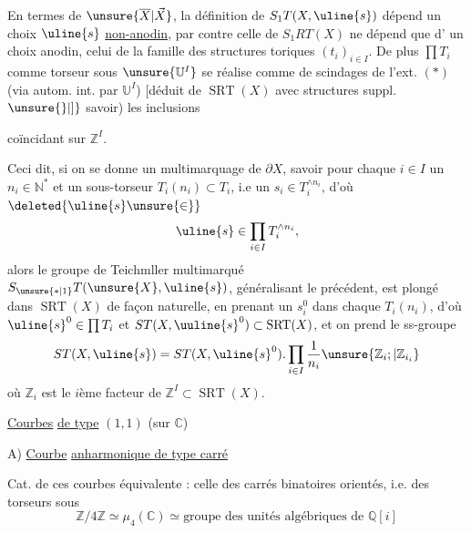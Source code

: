 En termes de $\unsure{\overline X|\vec X}$, la définition de
$S_1T(X,\uline{s})$
dépend un choix $\uline{s}$ \uline{non-anodin},
par contre celle de $S_1RT(X)$ ne dépend que d'
un choix anodin, celui de la famille des
structures toriques $(t_i)_{i\in I}$.
De plus $\prod T_i$ comme
torseur sous $\unsure{\mathbb U^I}$ se réalise
comme  de scindages de l'ext. $(*)$
(via autom. int. par $\mathbb U^I$)
$\bigl[$déduit de $\operatorname{SRT}(X)$
avec  structures suppl.$\unsure{\}|]}$
savoir) les inclusions


coïncidant sur $\mathbb Z^I$.



Ceci dit, si on se donne un
multimarquage de $\partial X$, savoir pour
chaque $i\in I$ un $n_i\in\mathbb N^*$ et un
sous-torseur $T_i(n_i)\subset T_i$,  i.e
un $s_i\in T_i^{\wedge n_i}$, d'où $\deleted{\uline{s}\unsure{\in}}$
\[
\uline{s}\in\prod_{i\in I}T_i^{\wedge n_i},
\]
alors le groupe de Teichmller multimarqué
$S_{\unsure{*|1}}T(\unsure{X},\uline{s})$, généralisant le précédent, est
plongé dans $\operatorname{SRT}(X)$ de façon naturelle,
en prenant un $s_i^0$ dans chaque $T_i(n_i)$, d'où
$\uline{s}^0\in\prod T_i$ et $ST(X,\uuline{s}^0)\subset\operatorname{SRT}(X)$, et on
prend le ss-groupe
\[
ST(X,\uline{s})=ST(X,\uline{s}^0).\prod_{i\in I}\frac1{n_i}\unsure{\mathbb Z_i;|\mathbb Z_{i_i}}
\]
où $\mathbb Z_i$ est le $i$ème facteur de $\mathbb Z^I\subset\operatorname{SRT}(X)$.



\uline{Courbes}  \uline{de type} $(1,1)$ (sur $\mathbb C$)

A) \uline{Courbe}  \uline{anharmonique de type carré}

Cat. de ces courbes équivalente : celle des carrés
binatoires orientés, i.e. des torseurs sous
\[
\mathbb Z/4\mathbb Z\simeq\mu_4(\mathbb C)\simeq\text{groupe des unités algébriques de }\mathbb Q[i]
\]

